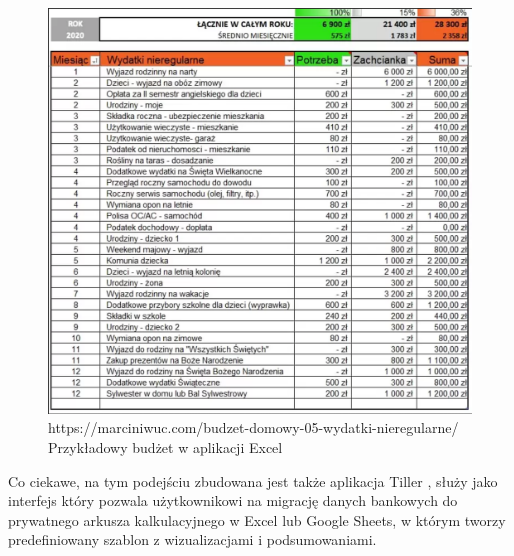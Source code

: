 \documentclass[a4paper, 10pt, twoside, openright]{report}
\begin{document}
\begin{large}
\begin{figure}[H]           %
    \centering
    \includegraphics[width=12cm]{figures/marciniwuc.com_Wydatki-nieregularne-plan-roczny.png}
    \caption{https://marciniwuc.com/budzet-domowy-05-wydatki-nieregularne/ Przykładowy budżet w aplikacji Excel}
    \label{fig:budzetprzykladowyexcel}
\end{figure}

{Co ciekawe, na tym podejściu zbudowana jest także aplikacja Tiller 
\cite{tiller}, służy jako interfejs który pozwala użytkownikowi na migrację 
danych bankowych do prywatnego arkusza kalkulacyjnego w Excel lub Google Sheets,
 w którym tworzy predefiniowany szablon z wizualizacjami i podsumowaniami.}


\end{large}
\end{document}
